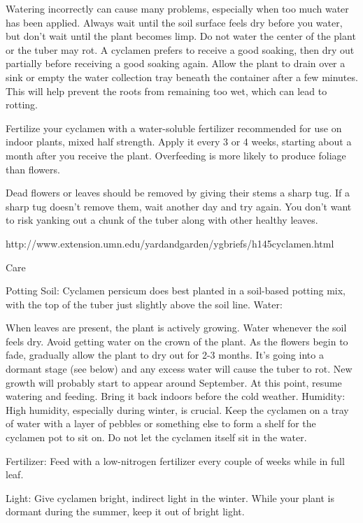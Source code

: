 \documentclass{book}
\begin{document}
Watering incorrectly can cause many problems, especially when too much water has been applied. Always wait until the soil surface feels dry before you water, but don't wait until the plant becomes limp. Do not water the center of the plant or the tuber may rot. A cyclamen prefers to receive a good soaking, then dry out partially before receiving a good soaking again. Allow the plant to drain over a sink or empty the water collection tray beneath the container after a few minutes. This will help prevent the roots from remaining too wet, which can lead to rotting.

Fertilize your cyclamen with a water-soluble fertilizer recommended for use on indoor plants, mixed half strength. Apply it every 3 or 4 weeks, starting about a month after you receive the plant. Overfeeding is more likely to produce foliage than flowers.

Dead flowers or leaves should be removed by giving their stems a sharp tug. If a sharp tug doesn't remove them, wait another day and try again. You don't want to risk yanking out a chunk of the tuber along with other healthy leaves.

http://www.extension.umn.edu/yardandgarden/ygbriefs/h145cyclamen.html



Care

Potting Soil: Cyclamen persicum does best planted in a soil-based potting mix, with the top of the tuber just slightly above the soil line.
Water:

When leaves are present, the plant is actively growing. Water whenever the soil feels dry. Avoid getting water on the crown of the plant.
As the flowers begin to fade, gradually allow the plant to dry out for 2-3 months. It's going into a dormant stage (see below) and any excess water will cause the tuber to rot.
New growth will probably start to appear around September. At this point, resume watering and feeding. Bring it back indoors before the cold weather.
Humidity: High humidity, especially during winter, is crucial. Keep the cyclamen on a tray of water with a layer of pebbles or something else to form a shelf for the cyclamen pot to sit on. Do not let the cyclamen itself sit in the water.

Fertilizer: Feed with a low-nitrogen fertilizer every couple of weeks while in full leaf.

Light: Give cyclamen bright, indirect light in the winter. While your plant is dormant during the summer, keep it out of bright light.
\end{document}
